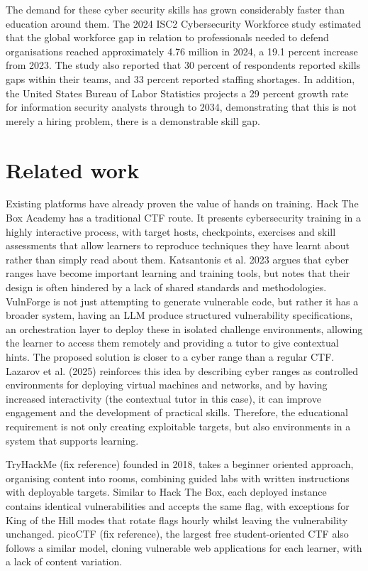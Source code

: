 The demand for these cyber security skills has grown considerably faster than education around them. The 2024 ISC2 Cybersecurity Workforce study estimated that the global workforce gap in relation to professionals needed to defend organisations reached approximately 4.76 million in 2024, a 19.1 percent increase from 2023\cite{noauthor_results_nodate}. The study also reported that 30 percent of respondents reported skills gaps within their teams, and 33 percent reported staffing shortages. In addition, the United States Bureau of Labor Statistics projects a 29 percent growth rate for information security analysts through to 2034\cite{noauthor_information_nodate}, demonstrating that this is not merely a hiring problem, there is a demonstrable skill gap. 

\section{Related work}\label{sec:related}

Existing platforms have already proven the value of hands on training. Hack The Box Academy has a traditional CTF route. It presents cybersecurity training in a highly interactive process, with target hosts, checkpoints, exercises and skill assessments that allow learners to reproduce techniques they have learnt about rather than simply read about them. Katsantonis et al. 2023 \cite{katsantonis_cyber_2023} argues that cyber ranges have become important learning and training tools, but notes that their design is often hindered by a lack of shared standards and methodologies. VulnForge is not just attempting to generate vulnerable code, but rather it has a broader system, having an LLM produce structured vulnerability specifications, an orchestration layer to deploy these in isolated challenge environments, allowing the learner to access them remotely and providing a tutor to give contextual hints. The proposed solution is closer to a cyber range than a regular CTF. Lazarov et al. (2025)\cite{lazarov_lessons_2025} reinforces this idea by describing cyber ranges as controlled environments for deploying virtual machines and networks, and by having increased interactivity (the contextual tutor in this case), it can improve engagement and the development of practical skills. Therefore, the educational requirement is not only creating exploitable targets, but also environments in a system that supports learning. 

TryHackMe\cite{tryhackme} (fix reference) founded in 2018, takes a beginner oriented approach, organising content into rooms, combining guided labs with written instructions with deployable targets. Similar to Hack The Box, each deployed instance contains identical vulnerabilities and accepts the same flag, with exceptions for King of the Hill modes that rotate flags hourly whilst leaving the vulnerability unchanged. picoCTF\cite{picoctf} (fix reference), the largest free student-oriented CTF also follows a similar model, cloning vulnerable web applications for each learner, with a lack of content variation. 

